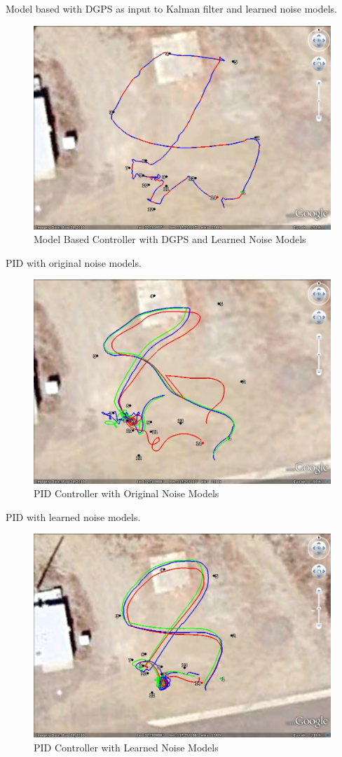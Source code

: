 Model based with DGPS as input to Kalman filter and learned noise models.

\begin{figure}[ht!]
	\centering
	\includegraphics[width=.75\textwidth]{images/GE/20101203_1606_kf_lyapUsingDgpsNewQR}
	\caption{Model Based Controller with DGPS and Learned Noise Models}
	\label{fig:kfResults3}
\end{figure}

PID with original noise models.

\begin{figure}[ht!]
	\centering
	\includegraphics[width=.75\textwidth]{images/GE/20101203_1755_kf_pidOrigQR}
	\caption{PID Controller with Original Noise Models}
	\label{fig:kfResults4}
\end{figure}

PID with learned noise models.

\begin{figure}[ht!]
	\centering
	\includegraphics[width=.75\textwidth]{images/GE/20101203_1751_kf_pidNewQR}
	\caption{PID Controller with Learned Noise Models}
	\label{fig:kfResults5}
\end{figure}


